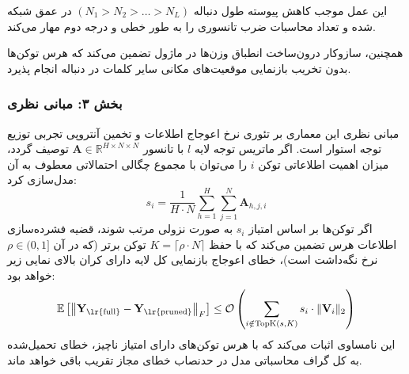 این عمل موجب کاهش پیوسته طول دنباله $(N_1 > N_2 > \dots > N_L)$ در عمق شبکه شده و تعداد محاسبات ضرب تانسوری را به طور خطی و درجه دوم مهار می‌کند.

همچنین، سازوکار درون‌ساخت انطباق وزن‌ها در ماژول  تضمین می‌کند که هرس توکن‌ها بدون تخریب بازنمایی موقعیت‌های مکانی سایر کلمات در دنباله انجام پذیرد.

\subsubsection*{بخش ۳: مبانی نظری }
مبانی نظری این معماری بر تئوری نرخ اعوجاج اطلاعات  و تخمین آنتروپی تجربی توزیع توجه استوار است. اگر ماتریس توجه لایه $l$ با تانسور $\mathbf{A} \in \mathbb{R}^{H \times N \times N}$ توصیف گردد، میزان اهمیت اطلاعاتی توکن $i$ را می‌توان با مجموع چگالی احتمالاتی معطوف به آن مدل‌سازی کرد:
\begin{equation}
s_i = \frac{1}{H \cdot N} \sum_{h=1}^H \sum_{j=1}^N \mathbf{A}_{h, j, i}
\end{equation}
اگر توکن‌ها بر اساس امتیاز $s_i$ به صورت نزولی مرتب شوند، قضیه فشرده‌سازی اطلاعات هرس تضمین می‌کند که با حفظ $K = \lceil \rho \cdot N \rceil$ توکن برتر (که در آن $\rho \in (0, 1]$ نرخ نگه‌داشت است)، خطای اعوجاج بازنمایی کل لایه دارای کران بالای نمایی زیر خواهد بود:
\begin{equation}
\mathbb{E}\left[ \left\| \mathbf{Y}_{\text{\lr{full}}} - \mathbf{Y}_{\text{\lr{pruned}}} \right\|_F \right] \le \mathcal{O}\left( \sum_{i \notin \operatorname{TopK}(s, K)} s_i \cdot \|\mathbf{V}_i\|_2 \right)
\end{equation}
این نامساوی اثبات می‌کند که با هرس توکن‌های دارای امتیاز ناچیز، خطای تحمیل‌شده به کل گراف محاسباتی مدل در حدنصاب خطای مجاز تقریب باقی خواهد ماند.

